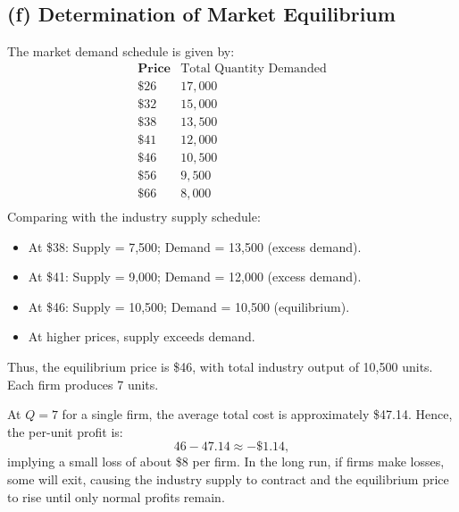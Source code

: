 \documentclass[12pt]{article}
\begin{document}
\subsection*{(f) Determination of Market Equilibrium}
The market demand schedule is given by:
\[
\begin{array}{c|c}
\textbf{Price} & \text{Total Quantity Demanded} \\
\hline
\$26 & 17,000 \\
\$32 & 15,000 \\
\$38 & 13,500 \\
\$41 & 12,000 \\
\$46 & 10,500 \\
\$56 & 9,500 \\
\$66 & 8,000 \\
\end{array}
\]
Comparing with the industry supply schedule:
\begin{itemize}[noitemsep]
  \item At \$38: Supply = 7,500; Demand = 13,500 (excess demand).
  \item At \$41: Supply = 9,000; Demand = 12,000 (excess demand).
  \item At \$46: Supply = 10,500; Demand = 10,500 (equilibrium).
  \item At higher prices, supply exceeds demand.
\end{itemize}
Thus, the equilibrium price is \$46, with total industry output of 10,500 units. Each firm produces 7 units.

At \(Q=7\) for a single firm, the average total cost is approximately \$47.14. Hence, the per-unit profit is:
\[
46 - 47.14 \approx -\$1.14,
\]
implying a small loss of about \$8 per firm. In the long run, if firms make losses, some will exit, causing the industry supply to contract and the equilibrium price to rise until only normal profits remain.
\end{document}
